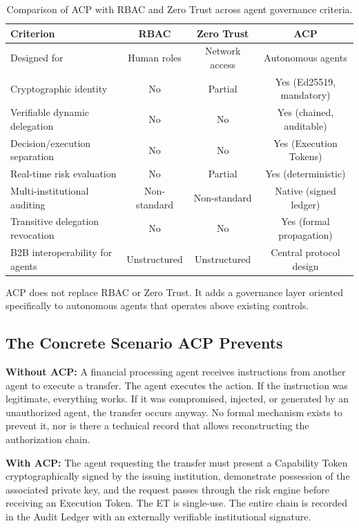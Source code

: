 \documentclass[11pt]{article}
\theoremstyle{definition}
\begin{document}
\begin{table}[h!]
\centering
\small
\begin{tabular}{@{}lccc@{}}
\toprule
\textbf{Criterion} & \textbf{RBAC} & \textbf{Zero Trust} & \textbf{ACP} \\
\midrule
Designed for & Human roles & Network access & Autonomous agents \\
Cryptographic identity & No & Partial & Yes (Ed25519, mandatory) \\
Verifiable dynamic delegation & No & No & Yes (chained, auditable) \\
Decision/execution separation & No & No & Yes (Execution Tokens) \\
Real-time risk evaluation & No & Partial & Yes (deterministic) \\
Multi-institutional auditing & Non-standard & Non-standard & Native (signed ledger) \\
Transitive delegation revocation & No & No & Yes (formal propagation) \\
B2B interoperability for agents & Unstructured & Unstructured & Central protocol design \\
\bottomrule
\end{tabular}
\caption{Comparison of ACP with RBAC and Zero Trust across agent governance criteria.}
\end{table}

ACP does not replace RBAC or Zero Trust. It adds a governance layer oriented specifically to autonomous agents that operates above existing controls.

\subsection{The Concrete Scenario ACP Prevents}

\textbf{Without ACP:}
A financial processing agent receives instructions from another agent to execute a transfer.
The agent executes the action.
If the instruction was legitimate, everything works.
If it was compromised, injected, or generated by an unauthorized agent, the transfer occurs anyway.
No formal mechanism exists to prevent it, nor is there a technical record that allows reconstructing the authorization chain.

\textbf{With ACP:}
The agent requesting the transfer must present a Capability Token cryptographically signed by the issuing institution,
demonstrate possession of the associated private key,
and the request passes through the risk engine before receiving an Execution Token.
The ET is single-use.
The entire chain is recorded in the Audit Ledger with an externally verifiable institutional signature.
\end{document}
